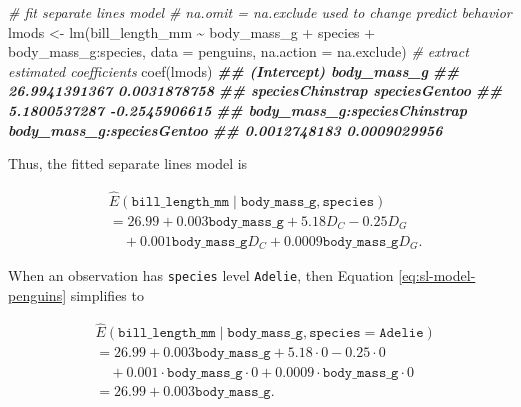 \documentclass[
]{book}
\newenvironment{Shaded}{\begin{snugshade}}{\end{snugshade}}
\newcommand{\AttributeTok}[1]{\textcolor[rgb]{0.77,0.63,0.00}{#1}}
\newcommand{\CommentTok}[1]{\textcolor[rgb]{0.56,0.35,0.01}{\textit{#1}}}
\newcommand{\DocumentationTok}[1]{\textcolor[rgb]{0.56,0.35,0.01}{\textbf{\textit{#1}}}}
\newcommand{\FunctionTok}[1]{\textcolor[rgb]{0.00,0.00,0.00}{#1}}
\newcommand{\NormalTok}[1]{#1}
\newcommand{\OtherTok}[1]{\textcolor[rgb]{0.56,0.35,0.01}{#1}}
\newcommand{\SpecialCharTok}[1]{\textcolor[rgb]{0.00,0.00,0.00}{#1}}
\theoremstyle{definition}
\theoremstyle{definition}
\theoremstyle{definition}
\theoremstyle{definition}
\theoremstyle{remark}
\begin{document}
\begin{Shaded}
\begin{Highlighting}[]
\CommentTok{\# fit separate lines model}
\CommentTok{\# na.omit = na.exclude used to change predict behavior}
\NormalTok{lmods }\OtherTok{\textless{}{-}} \FunctionTok{lm}\NormalTok{(bill\_length\_mm }\SpecialCharTok{\textasciitilde{}}\NormalTok{ body\_mass\_g }\SpecialCharTok{+}\NormalTok{ species }\SpecialCharTok{+}\NormalTok{ body\_mass\_g}\SpecialCharTok{:}\NormalTok{species,}
            \AttributeTok{data =}\NormalTok{ penguins, }\AttributeTok{na.action =}\NormalTok{ na.exclude)}
\CommentTok{\# extract estimated coefficients}
\FunctionTok{coef}\NormalTok{(lmods)}
\DocumentationTok{\#\#                  (Intercept)                  body\_mass\_g }
\DocumentationTok{\#\#                26.9941391367                 0.0031878758 }
\DocumentationTok{\#\#             speciesChinstrap                speciesGentoo }
\DocumentationTok{\#\#                 5.1800537287                {-}0.2545906615 }
\DocumentationTok{\#\# body\_mass\_g:speciesChinstrap    body\_mass\_g:speciesGentoo }
\DocumentationTok{\#\#                 0.0012748183                 0.0009029956}
\end{Highlighting}
\end{Shaded}

Thus, the fitted separate lines model is

\[
\begin{aligned}
&\hat{E}(\mathtt{bill\_length\_mm} \mid \mathtt{body\_mass\_g}, \mathtt{species}) \\
&= 26.99 + 0.003 \mathtt{body\_mass\_g} + 5.18 D_C - 0.25 D_G \\
& \quad + 0.001 \mathtt{body\_mass\_g} D_C + 0.0009 \mathtt{body\_mass\_g} D_G. \end{aligned}
\label{eq:sl-model-penguins}
\]

When an observation has \texttt{species} level \texttt{Adelie}, then Equation \eqref{eq:sl-model-penguins} simplifies to

\[
\begin{aligned}
&\hat{E}(\mathtt{bill\_length\_mm} \mid \mathtt{body\_mass\_g}, \mathtt{species}=\mathtt{Adelie}) \\
&=26.99 + 0.003 \mathtt{body\_mass\_g} + 5.18 \cdot 0 - 0.25 \cdot 0\\
&\quad + 0.001 \cdot \mathtt{body\_mass\_g} \cdot 0 + 0.0009 \cdot \mathtt{body\_mass\_g} \cdot 0\\
&= 26.99 + 0.003 \mathtt{body\_mass\_g}.
\end{aligned}
\]
\end{document}
